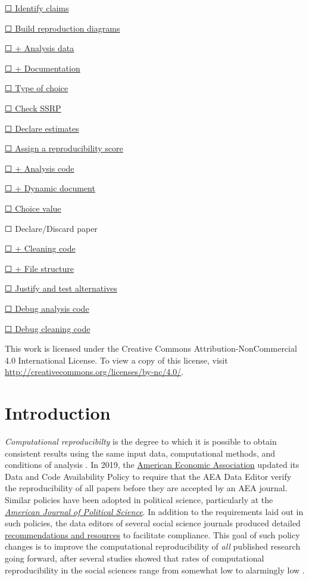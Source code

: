 \documentclass[
]{book}
\begin{document}
\protect\hyperlink{declare-estimates}{☐ Identify claims}

\protect\hyperlink{diagram}{☐ Build reproduction diagrams}

\protect\hyperlink{ad}{☐ + Analysis data}

\protect\hyperlink{paper-level}{☐ + Documentation}

\protect\hyperlink{id-type}{☐ Type of choice}

\protect\hyperlink{check-acre}{☐ Check SSRP}

\protect\hyperlink{declare-estimates}{☐ Declare estimates}

\protect\hyperlink{score}{☐ Assign a reproducibility score}

\protect\hyperlink{ac}{☐ + Analysis code}

\protect\hyperlink{paper-level}{☐ + Dynamic document}

\protect\hyperlink{id-val}{☐ Choice value}

☐ Declare/Discard paper

\protect\hyperlink{cc}{☐ + Cleaning code}

\protect\hyperlink{paper-level}{☐ + File structure}

\protect\hyperlink{test-rob}{☐ Justify and test alternatives}

\protect\hyperlink{dac}{☐ Debug analysis code}

\protect\hyperlink{dcc}{☐ Debug cleaning code}

This work is licensed under the Creative Commons Attribution-NonCommercial 4.0 International License. To view a copy of this license, visit \url{http://creativecommons.org/licenses/by-nc/4.0/}.

\hypertarget{intro}{%
\chapter*{Introduction}\label{intro}}

\emph{Computational reproducibilty} is the degree to which it is possible to obtain consistent results using the same input data, computational methods, and conditions of analysis \citep{national2019reproducibility}. In 2019, the \href{https://www.aeaweb.org/journals/policies/data-code/}{American Economic Association} updated its Data and Code Availability Policy to require that the AEA Data Editor verify the reproducibility of all papers before they are accepted by an AEA journal. Similar policies have been adopted in political science, particularly at the \href{https://ajps.org/ajps-verification-policy/}{\emph{American Journal of Political Science}}. In addition to the requirements laid out in such policies, the data editors of several social science journals produced detailed \href{https://social-science-data-editors.github.io/guidance/}{recommendations and resources} to facilitate compliance. This goal of such policy changes is to improve the computational reproducibility of \emph{all} published research going forward, after several studies showed that rates of computational reproducibility in the social sciences range from somewhat low to alarmingly low \citep{galiani2018make, chang2015economics, kingi2018reproducibility}.
\end{document}
